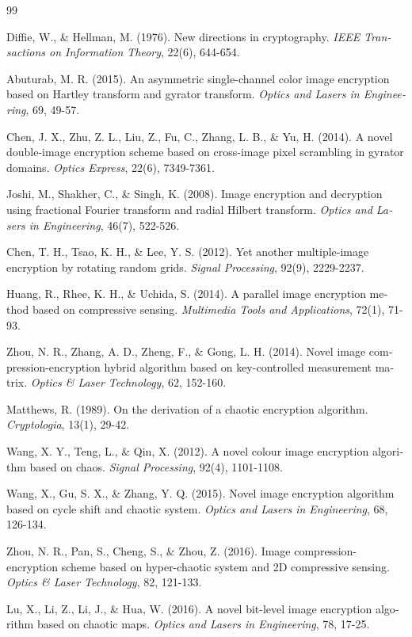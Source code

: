\documentclass[a4paper,12pt]{report}
\renewcommand{\%}{\lr{\oldpercent}}
\begin{document}
\begin{thebibliography}{99}
\begin{LTRbibitems}
\begin{latin}
 Diffie, W., \& Hellman, M. (1976). New directions in cryptography. \textit{IEEE Transactions on Information Theory}, 22(6), 644-654.

 Abuturab, M. R. (2015). An asymmetric single-channel color image encryption based on Hartley transform and gyrator transform. \textit{Optics and Lasers in Engineering}, 69, 49-57.

 Chen, J. X., Zhu, Z. L., Liu, Z., Fu, C., Zhang, L. B., \& Yu, H. (2014). A novel double-image encryption scheme based on cross-image pixel scrambling in gyrator domains. \textit{Optics Express}, 22(6), 7349-7361.

 Joshi, M., Shakher, C., \& Singh, K. (2008). Image encryption and decryption using fractional Fourier transform and radial Hilbert transform. \textit{Optics and Lasers in Engineering}, 46(7), 522-526.

 Chen, T. H., Tsao, K. H., \& Lee, Y. S. (2012). Yet another multiple-image encryption by rotating random grids. \textit{Signal Processing}, 92(9), 2229-2237.

 Huang, R., Rhee, K. H., \& Uchida, S. (2014). A parallel image encryption method based on compressive sensing. \textit{Multimedia Tools and Applications}, 72(1), 71-93.

 Zhou, N. R., Zhang, A. D., Zheng, F., \& Gong, L. H. (2014). Novel image compression-encryption hybrid algorithm based on key-controlled measurement matrix. \textit{Optics \& Laser Technology}, 62, 152-160.

 Matthews, R. (1989). On the derivation of a chaotic encryption algorithm. \textit{Cryptologia}, 13(1), 29-42.

 Wang, X. Y., Teng, L., \& Qin, X. (2012). A novel colour image encryption algorithm based on chaos. \textit{Signal Processing}, 92(4), 1101-1108.

 Wang, X., Gu, S. X., \& Zhang, Y. Q. (2015). Novel image encryption algorithm based on cycle shift and chaotic system. \textit{Optics and Lasers in Engineering}, 68, 126-134.

 Zhou, N. R., Pan, S., Cheng, S., \& Zhou, Z. (2016). Image compression-encryption scheme based on hyper-chaotic system and 2D compressive sensing. \textit{Optics \& Laser Technology}, 82, 121-133.

 Lu, X., Li, Z., Li, J., \& Hua, W. (2016). A novel bit-level image encryption algorithm based on chaotic maps. \textit{Optics and Lasers in Engineering}, 78, 17-25.


\end{latin}
\end{LTRbibitems}
\end{thebibliography}
\end{document}
